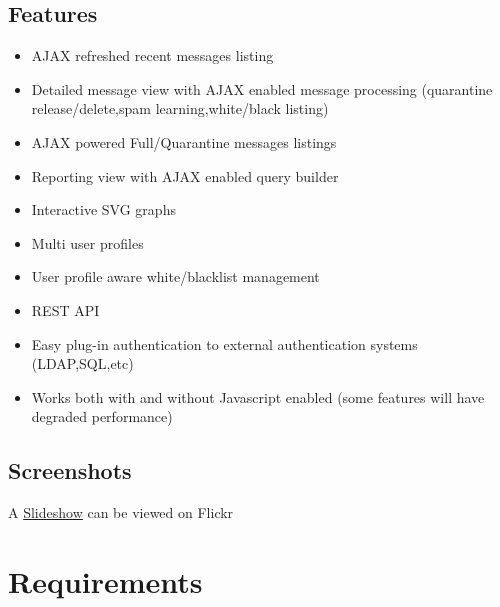 \documentclass[a4paper,10pt,english]{manual}
\begin{document}
\section{Features}
\begin{itemize}
\item {} 
AJAX refreshed recent messages listing

\item {} 
Detailed message view with AJAX enabled message processing (quarantine release/delete,spam learning,white/black listing)

\item {} 
AJAX powered Full/Quarantine messages listings

\item {} 
Reporting view with AJAX enabled query builder

\item {} 
Interactive SVG graphs

\item {} 
Multi user profiles

\item {} 
User profile aware white/blacklist management

\item {} 
REST API

\item {} 
Easy plug-in authentication to external authentication systems (LDAP,SQL,etc)

\item {} 
Works both with and without Javascript enabled (some features will have degraded performance)

\end{itemize}


\section{Screenshots}

A \href{http://www.flickr.com/photos/kissandrew/sets/72157623453063688/show/}{Slideshow} can be viewed
on Flickr

\resetcurrentobjects
\hypertarget{--doc-requirements}{}

\chapter{Requirements}
\end{document}
